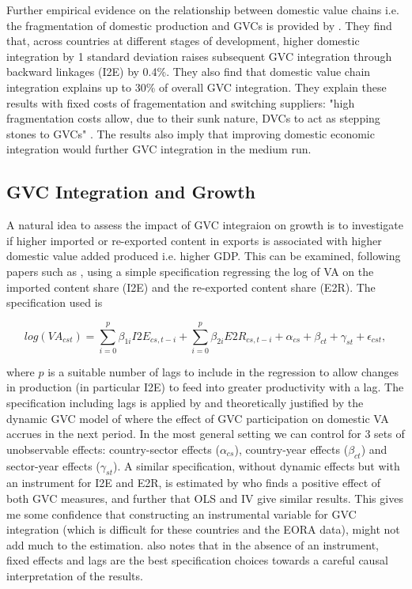 \documentclass[a4paper]{article}
\begin{document}

Further empirical evidence on the relationship between domestic value chains i.e. the fragmentation of domestic production and GVCs is provided by \citet{beverelli2019domestic}. They find that, across countries at different stages of development, higher domestic integration by 1 standard deviation raises subsequent GVC integration through backward linkages (I2E) by 0.4\%. They also find that domestic value chain integration explains up to 30\% of overall GVC integration. They explain these results with fixed costs of fragementation and switching suppliers: "high fragmentation costs allow, due to their sunk nature, DVCs to act as stepping stones to GVCs" \citep{beverelli2019domestic}. The results also imply that improving domestic economic integration would further GVC integration in the medium run. 

\subsection{GVC Integration and  Growth}

A natural idea to assess the impact of GVC integraion on growth is to investigate if higher imported or re-exported content in exports is associated with higher domestic value added produced i.e. higher GDP. This can be examined, following papers such as \citet{kummritz2015global}, using a simple specification regressing the log of VA on the imported content share (I2E) and the re-exported content share (E2R). The specification used is

\begin{equation} \label{eq:GROWTH_HDFE}
log(VA_{cst}) = \sum_{i=0}^p \beta_{1i} I2E_{cs,t-i} + \sum_{i = 0}^p \beta_{2i} E2R_{cs,t-i}  + \alpha_{cs} + \beta_{ct} +\gamma_{st} + \epsilon_{cst},
\end{equation}

where $p$ is a suitable number of lags to include in the regression to allow changes in production (in particular I2E) to feed into greater productivity with a lag. The specification including lags is applied by \citet{kummritz2015global} and theoretically justified by the dynamic GVC model of \citet{LiLiu2015moving} where the effect of GVC participation on domestic VA accrues in the next period. In the most general setting we can control for 3 sets of unobservable effects: country-sector effects ($\alpha_{cs}$), country-year effects ($\beta_{ct}$) and sector-year effects ($\gamma_{st}$). A similar specification, without dynamic effects but with an instrument for I2E and E2R, is estimated by \citet{Kummritz20161} who finds a positive effect of both GVC measures, and further that OLS and IV give similar results. This gives me some confidence that constructing an instrumental variable for GVC integration (which is difficult for these countries and the EORA data), might not add much to the estimation. \citet{kummritz2015global} also notes that in the absence of an instrument, fixed effects and lags are the best specification choices towards a careful causal interpretation of the results.  \newline
\end{document}
